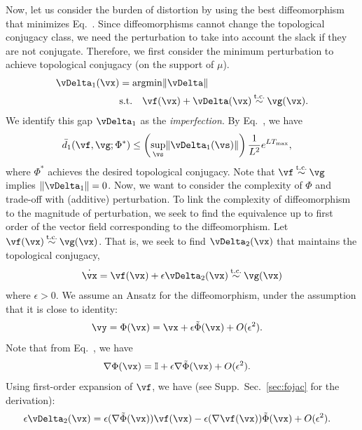 \documentclass{article}
\theoremstyle{definition} \newtheorem{definition}{Definition}  \newtheorem{example}{Example}
\theoremstyle{remark} \newtheorem{remark}{Remark}
\renewcommand{\eqref}{Eq.~\originaleqref}
\newcounter{ct}
\DeclareMathOperator*{\argmin}{\rm argmin}
\DeclarePairedDelimiter{\norm}{\lVert}{\rVert}
\newcommand{\tconju}{\mathbin{\overset{\text{t.c.}}{\sim}}}
\newcommand{\identity}{\ensuremath{\mathbb{I}}}
\newcommand{\homeo}{\Phi} %
\begin{document}
Now, let us consider the burden of distortion by using the best diffeomorphism that minimizes \eqref{eq:ed1}.
Since diffeomorphisms cannot change the topological conjugacy class, we need the perturbation to take into account the slack if they are not conjugate.
Therefore, we first consider the minimum perturbation to achieve topological conjugacy (on the support of $\mu$).
\begin{align}
    \vDelta_1(\vx) &= \argmin \norm{\vDelta}
    \label{eq:d1:min}
    \\
    & \text{s.t.} \quad
    \vf(\vx) + \vDelta(\vx)
    \tconju
    \vg(\vx).
    \label{eq:d1:tc}
\end{align}
We identify this gap $\vDelta_1$ as the \emph{imperfection}.
By \eqref{eq:d0bound}, we have
\begin{align}
    \bar{d}_1(\vf, \vg; \homeo^\ast)
	&\leq
	\left(\sup_\vs \norm{\vDelta_1(\vs)}\right) \frac{1}{L^2} e^{LT_{\text{max}}},
\end{align}
where $\homeo^\ast$ achieves the desired topological conjugacy.
Note that $\vf \tconju \vg$ implies $\norm{\vDelta_1} = 0$.
Now, we want to consider the complexity of $\homeo$ and trade-off with (additive) perturbation.
To link the complexity of diffeomorphism to the magnitude of perturbation, we seek to find the equivalence up to first order of the vector field corresponding to the diffeomorphism.
Let
$
\vf(\vx)
    \tconju
\vg(\vx)
$.
That is, we seek to find $\vDelta_2(\vx)$ that maintains the topological conjugacy,
\begin{align}
    \dot\vx = \vf(\vx) + \epsilon \vDelta_2(\vx)
    \tconju
    \vg(\vx)
    \label{eq:pareto:tc}
\end{align}
where $\epsilon > 0$.
We assume an Ansatz for the diffeomorphism, under the assumption that it is close to identity:
\begin{align}\label{eq:h:ansatz}
    \vy &= \homeo(\vx) = \vx + \epsilon \tilde\homeo(\vx) + O(\epsilon^2).
\end{align}
Note that from \eqref{eq:h:ansatz}, we have
\begin{align}
    \nabla\homeo(\vx) &= \identity + \epsilon\nabla\tilde\homeo(\vx) + O(\epsilon^2).
\end{align}
Using first-order expansion of $\vf$, we have (see Supp.~Sec.~\ref{sec:fojac} for the derivation):
\begin{align}
    \epsilon \vDelta_2(\vx) &=
	\epsilon (\nabla\tilde\homeo(\vx)) \vf(\vx)
	-
	\epsilon (\nabla\vf(\vx)) \tilde\homeo(\vx)
	+ O(\epsilon^2).
\end{align}
\end{document}
